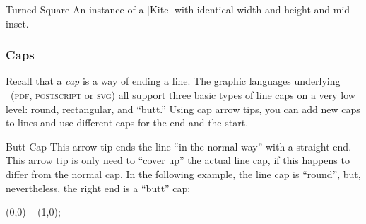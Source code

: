 \begin{arrowtipsimple}{Turned Square}
  An instance of a |Kite| with identical width and height and mid-inset.
  
  \begin{arrowexamples}
    \arrowexample[]
    \arrowexampledup[sep]
    \arrowexampledupdot[sep]
    \arrowexample[open]
    \arrowexample[length=4pt]
    \arrowexample[round]
    \arrowexample[slant=.3]
    \arrowexample[left]
    \arrowexample[right]
    \arrowexample[red]
  \end{arrowexamples}
\end{arrowtipsimple}



\subsubsection{Caps}

Recall that a \emph{cap} is a way of ending a line. The graphic
languages underlying \tikzname\ (\textsc{pdf}, \textsc{postscript} or
\textsc{svg}) all support three basic types of line caps on a very low
level: round, rectangular, and ``butt.'' Using cap arrow tips, you can
add new caps to lines and use different caps for the end and the
start.


\begin{arrowtipsimple}{Butt Cap}
  This arrow tip ends the line ``in the normal way'' with a straight
  end. This arrow tip is only need to ``cover up'' the actual line
  cap, if this happens to differ from the normal cap. In the following
  example, the line cap is ``round'', but, nevertheless, the right end
  is a ``butt'' cap:

\begin{codeexample}[]
\tikz \draw [line width=1ex, line cap=round, -Butt Cap] (0,0) -- (1,0);    
\end{codeexample}
\end{arrowtipsimple}


